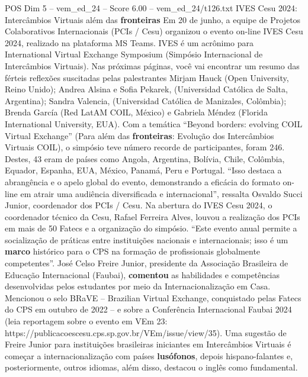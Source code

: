 \begin{textsample}{POS Dim 5 – vem\_ed\_24 – Score 6.00 – vem\_ed\_24/t126.txt}  \label{ex:f5_pos_013}
IVES Cesu 2024: Intercâmbios Virtuais além das \textbf{fronteiras} Em 20 de junho, a equipe de Projetos Colaborativos Internacionais (PCIs / Cesu) organizou o evento on-line IVES Cesu 2024, realizado na plataforma MS Teams.
IVES é um acrônimo para International Virtual Exchange Symposium (Simpósio Internacional de Intercâmbios Virtuais).
Nas próximas páginas, você vai encontrar um resumo das férteis reflexões suscitadas pelas palestrantes Mirjam Hauck (Open University, Reino Unido); Andrea Alsina e Sofia Pekarek, (Universidad Católica de Salta, Argentina); Sandra Valencia, (Universidad Católica de Manizales, Colômbia); Brenda García (Red LatAM COIL, México) e Gabriela Méndez (Florida International University, EUA).
Com a temática “Beyond borders: evolving COIL Virtual Exchange” (Para além das \textbf{fronteiras}: Evolução dos Intercâmbios Virtuais COIL), o simpósio teve número recorde de participantes, foram 246.
Destes, 43 eram de países como Angola, Argentina, Bolívia, Chile, Colômbia, Equador, Espanha, EUA, México, Panamá, Peru e Portugal. “Isso destaca a abrangência e o apelo global do evento, demonstrando a eficácia do formato on-line em atrair uma audiência diversificada e internacional”, ressalta Osvaldo Succi Junior, coordenador dos PCIs / Cesu.
Na abertura do IVES Cesu 2024, o coordenador técnico da Cesu, Rafael Ferreira Alves, louvou a realização dos PCIs em mais de 50 Fatecs e a organização do simpósio. “Este evento anual permite a socialização de práticas entre instituições nacionais e internacionais; isso é um \textbf{marco} histórico para o CPS na formação de profissionais globalmente competentes”.
José Celso Freire Junior, presidente da Associação Brasileira de Educação Internacional (Faubai), \textbf{comentou} as habilidades e competências desenvolvidas pelos estudantes por meio da Internacionalização em Casa.
Mencionou o selo BRaVE – Brazilian Virtual Exchange, conquistado pelas Fatecs do CPS em outubro de 2022 – e sobre a Conferência Internacional Faubai 2024 (leia reportagem sobre o evento em VEm 23: https://publicacoescesu.cps.sp.gov.br/VEm/issue/view/35).
Uma sugestão de Freire Junior para instituições brasileiras iniciantes em Intercâmbios Virtuais é começar a internacionalização com países \textbf{lusófonos}, depois hispano-falantes e, posteriormente, outros idiomas, além disso, destacou o inglês como fundamental.

\end{textsample}
